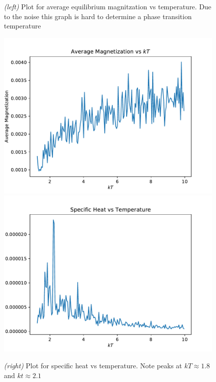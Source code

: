 \documentclass{article}
\begin{document}
\begin{figure}[H]
  \caption{\textit{(left)} Plot for average equilibrium magnitzation vs temperature.
  Due to the noise this graph is hard to determine a phase transition temperature}
  \includegraphics[scale=0.35]{d_mags.pdf}
  \includegraphics[scale=0.35]{d_cv.pdf}
  \caption{\textit{(right)} Plot for specific heat vs temperature. Note peaks at
  $kT \approx 1.8 $ and $kt \approx 2.1$}
\end{figure}
\end{document}
